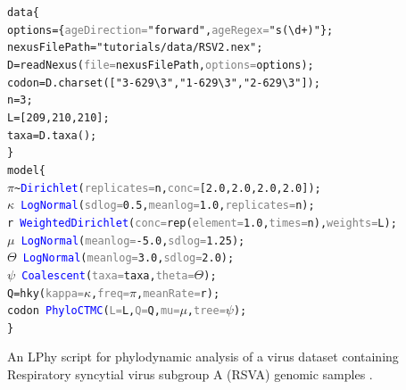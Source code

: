 \documentclass[10pt,letterpaper,table]{article}
\begin{document}
{
  \small
  \begin{listing}
    \begin{alltt}
      data \{
      \quad options = \{\textcolor{gray}{ageDirection=}\textcolor{constant}{"forward"}, \textcolor{gray}{ageRegex=}\textcolor{constant}{"s(\textbackslash{}d+)"}\};
      \quad nexusFilePath = \textcolor{constant}{"tutorials/data/RSV2.nex"};
      \quad D = \textcolor{generator}{readNexus}(\textcolor{gray}{file=}nexusFilePath, \textcolor{gray}{options=}options);
      \quad codon = D.\textcolor{generator}{charset}([\textcolor{constant}{"3-629\textbackslash{}3"}, \textcolor{constant}{"1-629\textbackslash{}3"}, \textcolor{constant}{"2-629\textbackslash{}3"}]);
      \quad n = \textcolor{constant}{3};
      \quad L = [\textcolor{constant}{209}, \textcolor{constant}{210}, \textcolor{constant}{210}];
      \quad taxa = D.\textcolor{generator}{taxa}();
      \}
      model \{
      \quad \textcolor{bluishgreen}{\(\pi\)} \textasciitilde \textcolor{blue}{Dirichlet}(\textcolor{gray}{replicates=}n, \textcolor{gray}{conc=}[\textcolor{constant}{2.0}, \textcolor{constant}{2.0}, \textcolor{constant}{2.0}, \textcolor{constant}{2.0}]);
      \quad \textcolor{bluishgreen}{\(\kappa\)} ~ \textcolor{blue}{LogNormal}(\textcolor{gray}{sdlog=}\textcolor{constant}{0.5}, \textcolor{gray}{meanlog=}\textcolor{constant}{1.0}, \textcolor{gray}{replicates=}n);
      \quad \textcolor{bluishgreen}{r} ~ \textcolor{blue}{WeightedDirichlet}(\textcolor{gray}{conc=}\textcolor{generator}{rep}(\textcolor{gray}{element=}\textcolor{constant}{1.0}, \textcolor{gray}{times=}n), \textcolor{gray}{weights=}L);
      \quad \textcolor{bluishgreen}{\(\mu\)} ~ \textcolor{blue}{LogNormal}(\textcolor{gray}{meanlog=}\textcolor{constant}{-5.0}, \textcolor{gray}{sdlog=}\textcolor{constant}{1.25});
      \quad \textcolor{bluishgreen}{\(\Theta\)} ~ \textcolor{blue}{LogNormal}(\textcolor{gray}{meanlog=}\textcolor{constant}{3.0}, \textcolor{gray}{sdlog=}\textcolor{constant}{2.0});
      \quad \textcolor{bluishgreen}{\(\psi\)} ~ \textcolor{blue}{Coalescent}(\textcolor{gray}{taxa=}taxa, \textcolor{gray}{theta=}\textcolor{bluishgreen}{\(\Theta\)});
      \quad Q = \textcolor{generator}{hky}(\textcolor{gray}{kappa=}\textcolor{bluishgreen}{\(\kappa\)}, \textcolor{gray}{freq=}\textcolor{bluishgreen}{\(\pi\)}, \textcolor{gray}{meanRate=}\textcolor{bluishgreen}{r});
      \quad \textcolor{bluishgreen}{codon} ~ \textcolor{blue}{PhyloCTMC}(\textcolor{gray}{L=}L, \textcolor{gray}{Q=}Q, \textcolor{gray}{mu=}\textcolor{bluishgreen}{\(\mu\)}, \textcolor{gray}{tree=}\textcolor{bluishgreen}{\(\psi\)});
      \}
    \end{alltt}
    \caption{An LPhy script for phylodynamic analysis of a virus dataset containing Respiratory syncytial virus subgroup A (RSVA) genomic samples \cite{zlateva2004molecular, zlateva2005genetic}.
    \newline}
    \label{lphy:rsva}
  \end{listing}
}
\end{document}

